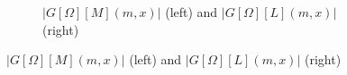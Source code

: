\documentclass[11pt,reqno,a4letter]{article}
\numberwithin{equation}{section}
\numberwithin{figure}{section}
\numberwithin{table}{section}
\theoremstyle{plain}
\numberwithin{theorem}{section}
\theoremstyle{definition}
\begin{document}
\begin{figure}[ht!]
\smallskip

\begin{subfigure}{\textwidth}
\centering
\begin{subfigure}{0.375\textwidth}
\end{subfigure}\hfil
\centering
\begin{subfigure}{0.375\textwidth}
\end{subfigure}
\captionsetup{justification=centering}
\caption{$|G[\Omega][M](m, x)|$ (left) and $|G[\Omega][L](m, x)|$ (right)} 
\end{subfigure}


\end{figure}
\end{document}
